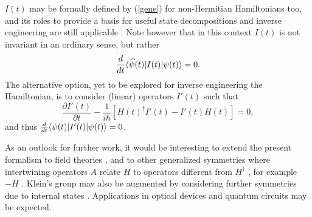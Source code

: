 $I(t)$ may be formally defined by (\ref{gene}) for non-Hermitian Hamiltonians too, and its
roles to provide a basis for useful state decompositions and inverse engineering are still
applicable \cite{Ibanez2011}.
Note however that in this context $I(t)$ is not invariant in an ordinary sense, but rather
%
\begin{equation}
\frac{d}{dt}\langle \widehat{\psi}(t)|I(t)|\psi(t)\rangle=0.
\end{equation}
%
The alternative option, yet to be explored for inverse engineering the Hamiltonian,
is to consider (linear) operators $I'(t)$ such that
%
\begin{equation}
\frac{\partial I'(t)}{\partial t}-\frac{1}{i\hbar}[H(t)^\dagger I'(t)-I'(t)H(t)]=0,
\label{gene2}
\end{equation}
%
and thus  $\frac{d}{dt}\langle \psi(t)|I'(t)|\psi(t)\rangle=0$.

As an outlook for further work, it would be interesting to extend the present formalism
to field theories \cite{Alexandre2017},
and to other generalized symmetries
where  intertwining operators $A$ relate $H$ to  operators different from $H^\dagger$
\cite{Correa2015,Guilarte2017,Deak2012}, for example $-H$ \cite{Chen2017}.
Klein's group may also be augmented by considering further symmetries due to internal states \cite{Kartashov2014}.
Applications in optical devices   \cite{Longhi2017a} and quantum circuits \cite{Ruschhaupt2017} may be expected.
